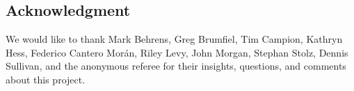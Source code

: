
\subsection*{Acknowledgment}

We would like to thank Mark Behrens, Greg Brumfiel, Tim Campion, Kathryn Hess, Federico Cantero Mor\'an, Riley Levy, John Morgan, Stephan Stolz, Dennis Sullivan, and the anonymous referee for their insights, questions, and comments about this project.